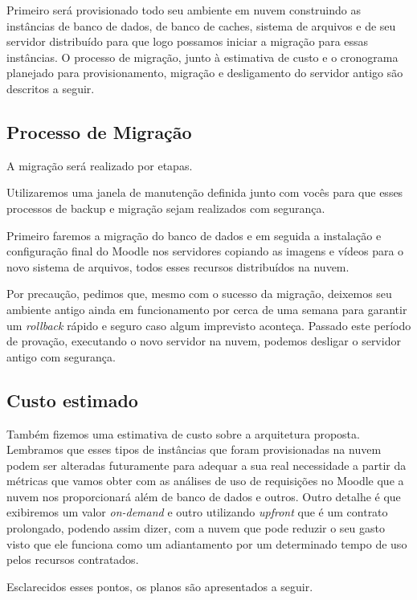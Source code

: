 \documentclass{article}
\begin{document}

Primeiro será provisionado todo seu ambiente em nuvem construindo as instâncias de banco de dados, de banco de caches, sistema de arquivos e de seu servidor distribuído para que logo possamos iniciar a migração para essas instâncias.
O processo de migração, junto à estimativa de custo e o cronograma planejado para provisionamento, migração e desligamento do servidor antigo são descritos a seguir.


\subsection{Processo de Migração}

A migração será realizado por etapas.

Utilizaremos uma janela de manutenção definida junto com vocês para que esses processos de backup e migração sejam realizados com segurança.

Primeiro faremos a migração do banco de dados e em seguida a instalação e configuração final do Moodle nos servidores copiando as imagens e vídeos para o novo sistema de arquivos, todos esses recursos distribuídos na nuvem.

Por precaução, pedimos que, mesmo com o sucesso da migração, deixemos seu ambiente antigo ainda em funcionamento por cerca de uma semana para garantir um \textit{rollback} rápido e seguro caso algum imprevisto aconteça. 
Passado este período de provação, executando o novo servidor na nuvem, podemos desligar o servidor antigo com segurança.

\subsection{Custo estimado}

Também fizemos uma estimativa de custo sobre a arquitetura proposta. 
Lembramos que esses tipos de instâncias que foram provisionadas na nuvem podem ser alteradas futuramente para adequar a sua real necessidade a partir da métricas que vamos obter com as análises de uso de requisições no Moodle que a nuvem nos proporcionará além de banco de dados e outros. 
Outro detalhe é que exibiremos um valor \textit{on-demand} e outro utilizando \textit{upfront} que é um contrato prolongado, podendo assim dizer, com a nuvem que pode reduzir o seu gasto visto que ele funciona como um adiantamento por um determinado tempo de uso pelos recursos contratados. 

Esclarecidos esses pontos, os planos são apresentados a seguir.
\end{document}

